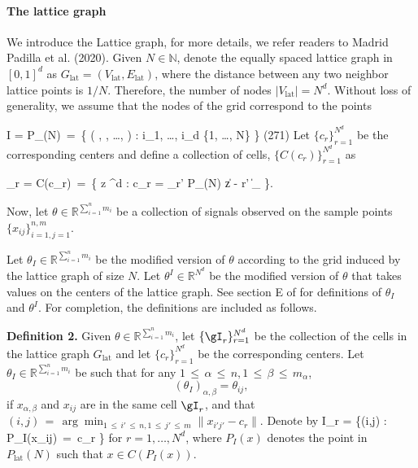 \documentclass[twoside,11pt]{article}
\makeatletter
\newcommand{\discardlabel}[1]{}
\newcommand{\discardtwo}[2]{}
\newcommand{\legacyref}[1]{\textup{[source ref.]}}
\newcommand{\legacyeqref}[1]{\textup{[source equation]}}
\newenvironment{legacycomparison}{%
  \begingroup\color{legacygray}%
  \let\label\discardlabel
  \let\originallabel\discardlabel
  \let\ref\legacyref
  \let\pageref\legacyref
  \let\eqref\legacyeqref
  \let\cref\legacyref
  \let\Cref\legacyref
  \let\autoref\legacyref
  \let\aliasref\discardtwo
}{\endgroup}
\newcommand{\aliasref}[2]{%
  \@ifundefined{r@#2}{}{%
    \expandafter\let\csname r@#1\expandafter\endcsname\csname r@#2\endcsname}}
\makeatother
\begin{document}
\begin{legacycomparison}
\paragraph{The lattice graph}
\label{knn_notation}
We introduce the Lattice graph, for more details, we refer readers to Madrid Padilla et al. (2020).
Given \( N \in \mathbb{N} \), denote the equally spaced lattice graph in \( [0,1]^d \) as \( G_\text{lat} = (V_\text{lat}, E_\text{lat}) \), where the distance between any two neighbor lattice points is \( 1/N \). Therefore, the number of nodes \( |V_\text{lat}| = N^d \). Without loss of generality, we assume that the nodes of the grid correspond to the points
\beq 
\label{lat_g}
I = P_(N) \,=\, \left\{ \left( , , \ldots,  \right) : i_1, \ldots, i_d \in \{1, \ldots, N\} \right\} \quad (271)
\beq 
Let \( \{c_r\}_{r=1}^{N^d} \) be the corresponding centers and define a collection of cells, \( \{C(c_r)\}_{r=1}^{N^d} \) as
\beq 
\label{knn_center}
\gI_r = C(c_r) \,=\, \left\{ z \in [0,1]^d : c_r = \arg\min_{r' \in P_(N)} \| z - r' \|_{\infty} \right\}.
\beq 

Now, let \( \theta \in \mathbb{R}^{\sum_{i=1}^n m_i} \) be a collection of signals observed on the sample points \( \{x_{ij}\}_{i=1,j=1}^{n,m} \). 


Let \( \theta_I \in \mathbb{R}^{\sum_{i=1}^n m_i} \) be the modified version of \( \theta \) according to the grid induced by the lattice graph of size \( N \). Let \( \theta^I \in \mathbb{R}^{N^d} \) be the modified version of \( \theta \) that takes values on the centers of the lattice graph. See section E of \cite{madrid2020adaptive} for definitions of \( \theta_I \) and \( \theta^I \). For completion, the definitions are included as follows.

\textbf{Definition 2.} Given \( \theta \in \mathbb{R}^{\sum_{i=1}^n m_i} \), let \( \{\gI_r\}_{r=1}^{N^d} \) be the collection of the cells in the lattice graph \( G_\text{lat} \) and let \( \{c_r\}_{r=1}^{N^d} \) be the corresponding centers. Let \( \theta_I \in \mathbb{R}^{\sum_{i=1}^n m_i} \) be such that for any \( 1 \,\leq\, \alpha \,\leq\, n, 1 \,\leq\, \beta \,\leq\, m_{\alpha} \),
\[
(\theta_I)_{\alpha,\beta} = \theta_{ij},
\]
if \( x_{\alpha,\beta} \) and \( x_{ij} \) are in the same cell \( \gI_r \), and that \( (i,j) \,=\, \arg\min_{1 \,\leq\, i' \,\leq\, n,1 \,\leq\, j' \,\leq\, m} \|x_{i'j'} - c_r\| \). 
Denote by 
\beq \label{I_r} I_r = \{(i,j) \in [n] \times [m] : P_I(x_{ij}) \,=\, c_r \} \beq  for \( r = 1, \ldots, N^d \), where \( P_I(x) \) denotes the point in \( P_\text{lat}(N) \) such that \( x \in C(P_I(x)) \).


\end{legacycomparison}
\end{document}

